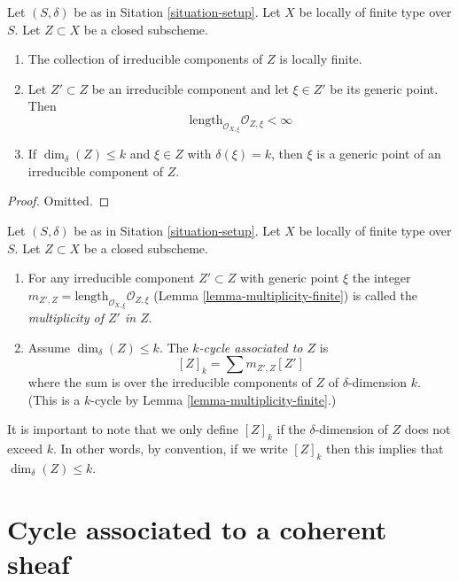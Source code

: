 \begin{lemma}
\label{lemma-multiplicity-finite}
Let $(S, \delta)$ be as in Sitation \ref{situation-setup}.
Let $X$ be locally of finite type over $S$.
Let $Z \subset X$ be a closed subscheme.
\begin{enumerate}
\item The collection of irreducible components of $Z$
is locally finite.
\item Let $Z' \subset Z$ be an irreducible component and
let $\xi \in Z'$ be its generic point.
Then
$$
\text{length}_{\mathcal{O}_{X, \xi}} \mathcal{O}_{Z, \xi} < \infty
$$
\item If $\dim_\delta(Z) \leq k$ and $\xi \in Z$ with
$\delta(\xi) = k$, then $\xi$ is a generic point of an
irreducible component of $Z$.
\end{enumerate}
\end{lemma}

\begin{proof}
Omitted.
\end{proof}

\begin{definition}
\label{definition-cycle-associated-to-closed-subscheme}
Let $(S, \delta)$ be as in Sitation \ref{situation-setup}.
Let $X$ be locally of finite type over $S$.
Let $Z \subset X$ be a closed subscheme.
\begin{enumerate}
\item For any irreducible component $Z' \subset Z$ with generic point $\xi$
the integer
$m_{Z', Z} = \text{length}_{\mathcal{O}_{X, \xi}} \mathcal{O}_{Z, \xi}$
(Lemma \ref{lemma-multiplicity-finite})
is called the {\it multiplicity of $Z'$ in $Z$}.
\item Assume $\dim_\delta(Z) \leq k$.
The {\it $k$-cycle associated to $Z$} is
$$
[Z]_k
=
\sum m_{Z', Z}[Z']
$$
where the sum is over the irreducible components of $Z$
of $\delta$-dimension $k$. (This is a $k$-cycle by
Lemma \ref{lemma-multiplicity-finite}.)
\end{enumerate}
\end{definition}

\noindent
It is important to note that we only define $[Z]_k$ if the $\delta$-dimension
of $Z$ does not exceed $k$. In other words, by convention, if we write
$[Z]_k$ then this implies that $\dim_\delta(Z) \leq k$.



\section{Cycle associated to a coherent sheaf}
\label{section-cycle-of-coherent-sheaf}



